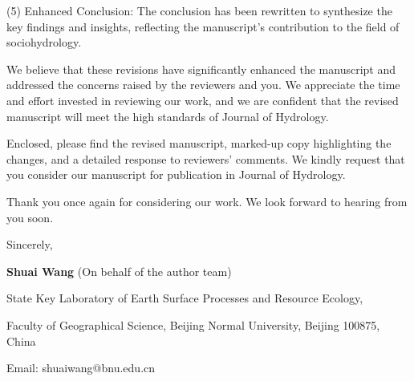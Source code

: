 \documentclass[11pt,a4paper,roman]{moderncv}
\begin{document}
(5) Enhanced Conclusion: The conclusion has been rewritten to synthesize the key findings and insights, reflecting the manuscript's contribution to the field of sociohydrology.

We believe that these revisions have significantly enhanced the manuscript and addressed the concerns raised by the reviewers and you. We appreciate the time and effort invested in reviewing our work, and we are confident that the revised manuscript will meet the high standards of Journal of Hydrology.

Enclosed, please find the revised manuscript, marked-up copy highlighting the changes, and a detailed response to reviewers' comments. We kindly request that you consider our manuscript for publication in Journal of Hydrology.

Thank you once again for considering our work. We look forward to hearing from you soon.

Sincerely,

\textbf{Shuai Wang} (On behalf of the author team)

State Key Laboratory of Earth Surface Processes and Resource Ecology,

Faculty of Geographical Science, Beijing Normal University, Beijing 100875, China

Email: shuaiwang@bnu.edu.cn






\end{document}
